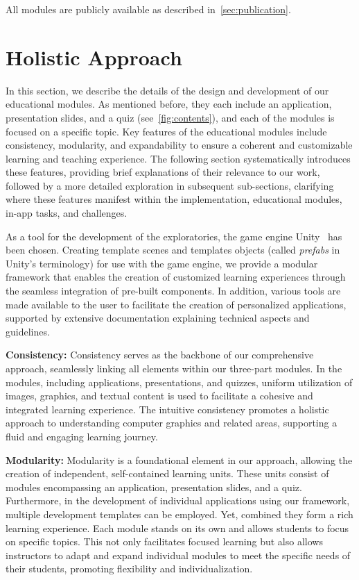 All modules are publicly available as described in~\autoref{sec:publication}.

\section{Holistic Approach}
In this section, we describe the details of the design and development of our educational modules. As mentioned before, they each include an application, presentation slides, and a quiz (see~\autoref{fig:contents}), and each of the modules is focused on a specific topic. Key features of the educational modules include consistency, modularity, and expandability to ensure a coherent and customizable learning and teaching experience. The following section systematically introduces these features, providing brief explanations of their relevance to our work, followed by a more detailed exploration in subsequent sub-sections, clarifying where these features manifest within the implementation, educational modules, in-app tasks, and challenges.

As a tool for the development of the exploratories, the game engine Unity~\cite{unity:2024:editor} has been chosen. Creating template scenes and templates objects (called \emph{prefabs} in Unity's terminology) for use with the game engine, we provide a modular framework that enables the creation of customized learning experiences through the seamless integration of pre-built components. In addition, various tools are made available to the user to facilitate the creation of personalized applications, supported by extensive documentation explaining technical aspects and guidelines.

\textbf{Consistency:}
Consistency serves as the backbone of our comprehensive approach, seamlessly linking all elements within our three-part modules. In the modules, including applications, presentations, and quizzes, uniform utilization of images, graphics, and textual content is used to facilitate a cohesive and integrated learning experience. The intuitive consistency promotes a holistic approach to understanding computer graphics and related areas, supporting a fluid and engaging learning journey.

\textbf{Modularity:}
Modularity is a foundational element in our approach, allowing the creation of independent, self-contained learning units. These units consist of modules encompassing an application, presentation slides, and a quiz. Furthermore, in the development of individual applications using our framework, multiple development templates can be employed. Yet, combined they form a rich learning experience. Each module stands on its own and allows students to focus on specific topics. This not only facilitates focused learning but also allows instructors to adapt and expand individual modules to meet the specific needs of their students, promoting flexibility and individualization.

